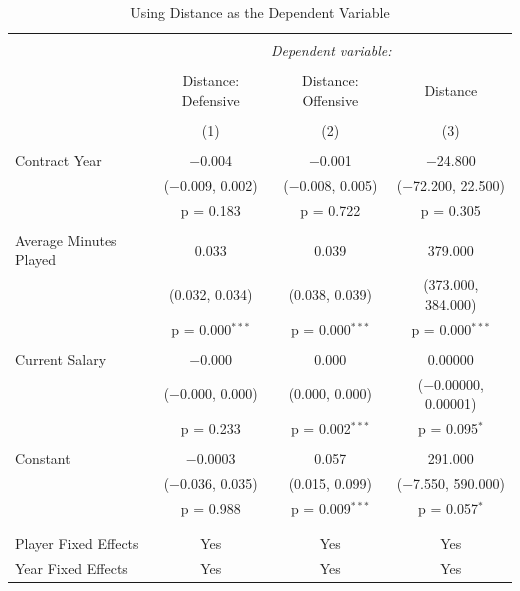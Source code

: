 \documentclass[12pt]{article}
\begin{document}
\begin{landscape}
		\begin{table}[!htbp] \centering 
			\caption{Using Distance as the Dependent Variable} 
			\label{} 
			\begin{tabular}{@{\extracolsep{5pt}}lccc} 
				\\[-1.8ex]\hline 
				\hline \\[-1.8ex] 
				& \multicolumn{3}{c}{\textit{Dependent variable:}} \\ 
				\cline{2-4} 
				\\[-1.8ex] & Distance: Defensive & Distance: Offensive & Distance \\ 
				\\[-1.8ex] & (1) & (2) & (3)\\ 
				\hline \\[-1.8ex] 
				Contract Year & $-$0.004 & $-$0.001 & $-$24.800 \\ 
				& ($-$0.009, 0.002) & ($-$0.008, 0.005) & ($-$72.200, 22.500) \\ 
				& p = 0.183 & p = 0.722 & p = 0.305 \\ 
				& & & \\ 
				Average Minutes Played & 0.033 & 0.039 & 379.000 \\ 
				& (0.032, 0.034) & (0.038, 0.039) & (373.000, 384.000) \\ 
				& p = 0.000$^{***}$ & p = 0.000$^{***}$ & p = 0.000$^{***}$ \\ 
				& & & \\ 
				Current Salary & $-$0.000 & 0.000 & 0.00000 \\ 
				& ($-$0.000, 0.000) & (0.000, 0.000) & ($-$0.00000, 0.00001) \\ 
				& p = 0.233 & p = 0.002$^{***}$ & p = 0.095$^{*}$ \\ 
				& & & \\ 
				Constant & $-$0.0003 & 0.057 & 291.000 \\ 
				& ($-$0.036, 0.035) & (0.015, 0.099) & ($-$7.550, 590.000) \\ 
				& p = 0.988 & p = 0.009$^{***}$ & p = 0.057$^{*}$ \\ 
				& & & \\ 
				\hline \\[-1.8ex] 
				Player Fixed Effects & Yes & Yes & Yes \\ 
				Year Fixed Effects & Yes & Yes & Yes \\ 

\end{tabular}
\end{table}
\end{landscape}
\end{document}
